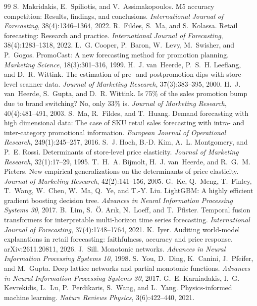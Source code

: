 \begin{thebibliography}{99}
 S.~Makridakis, E.~Spiliotis, and V.~Assimakopoulos. M5 accuracy competition: Results, findings, and conclusions. \emph{International Journal of Forecasting}, 38(4):1346--1364, 2022.
 R.~Fildes, S.~Ma, and S.~Kolassa. Retail forecasting: Research and practice. \emph{International Journal of Forecasting}, 38(4):1283--1318, 2022.
 L.~G. Cooper, P.~Baron, W.~Levy, M.~Swisher, and P.~Gogos. PromoCast: A new forecasting method for promotion planning. \emph{Marketing Science}, 18(3):301--316, 1999.
 H.~J. van~Heerde, P.~S.~H. Leeflang, and D.~R. Wittink. The estimation of pre- and postpromotion dips with store-level scanner data. \emph{Journal of Marketing Research}, 37(3):383--395, 2000.
 H.~J. van~Heerde, S.~Gupta, and D.~R. Wittink. Is 75\% of the sales promotion bump due to brand switching? No, only 33\% is. \emph{Journal of Marketing Research}, 40(4):481--491, 2003.
 S.~Ma, R.~Fildes, and T.~Huang. Demand forecasting with high dimensional data: The case of SKU retail sales forecasting with intra- and inter-category promotional information. \emph{European Journal of Operational Research}, 249(1):245--257, 2016.
 S.~J. Hoch, B.-D. Kim, A.~L. Montgomery, and P.~E. Rossi. Determinants of store-level price elasticity. \emph{Journal of Marketing Research}, 32(1):17--29, 1995.
 T.~H.~A. Bijmolt, H.~J. van~Heerde, and R.~G.~M. Pieters. New empirical generalizations on the determinants of price elasticity. \emph{Journal of Marketing Research}, 42(2):141--156, 2005.
 G.~Ke, Q.~Meng, T.~Finley, T.~Wang, W.~Chen, W.~Ma, Q.~Ye, and T.-Y. Liu. LightGBM: A highly efficient gradient boosting decision tree. \emph{Advances in Neural Information Processing Systems 30}, 2017.
 B.~Lim, S.~\"O. Ar{\i}k, N.~Loeff, and T.~Pfister. Temporal fusion transformers for interpretable multi-horizon time series forecasting. \emph{International Journal of Forecasting}, 37(4):1748--1764, 2021.
 K.~Iyer. Auditing world-model explanations in retail forecasting: faithfulness, accuracy and price response. arXiv:2611.20811, 2026.
 J.~Sill. Monotonic networks. \emph{Advances in Neural Information Processing Systems 10}, 1998.
 S.~You, D.~Ding, K.~Canini, J.~Pfeifer, and M.~Gupta. Deep lattice networks and partial monotonic functions. \emph{Advances in Neural Information Processing Systems 30}, 2017.
 G.~E. Karniadakis, I.~G. Kevrekidis, L.~Lu, P.~Perdikaris, S.~Wang, and L.~Yang. Physics-informed machine learning. \emph{Nature Reviews Physics}, 3(6):422--440, 2021.

\end{thebibliography}
